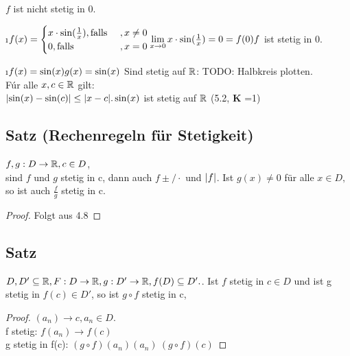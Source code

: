 \begin{enumerate}[a)]
$f$ ist nicht stetig in 0.
\begin{minipage}[c]{0.3\textwidth}
\end{minipage}
\i $f(x) = \begin{cases}
x \cdot \sin(\frac{1}{x}) , \text{falls }&, x \not = 0\\
0, \text{falls }&, x = 0\\
\end{cases}
\lim\limits_{x \rightarrow 0} x \cdot \sin(\frac{1}{x}) = 0 = f(0)\\
f$ ist stetig in 0.
\begin{minipage}[c]{0.3\textwidth}
\end{minipage}
\i $f(x) = \sin(x)\\
g(x) = \sin(x)
$
Sind stetig auf $\mathbb{R}$:
TODO: Halbkreis plotten.\\
Fúr alle $x,c \in \mathbb{R}$ gilt:\\
$\lvert \sin(x) - \sin(c) \rvert \leq \lvert x-c \rvert.\\
\sin(x)$ ist stetig auf $\mathbb{R}$ (5.2, $\mathbf{K}$ =1)
\end{enumerate}

\subsection{Satz (Rechenregeln für Stetigkeit)}
$f,g : D \rightarrow \mathbb{R}, c \in D$,\\
sind $f$ und $g$ stetig in c, dann auch $f \pm/\cdot$ und $\lvert f \rvert$. Ist $g(x) \neq 0$ für alle $x \in D,$ so ist auch $\frac{f}{g}$ stetig in c.\\
\begin{proof}
Folgt aus 4.8
\end{proof}
\subsection[Satz: Hintereinanderausführung von stetigen Funktionen]{Satz}
$D,D' \subseteq \mathbb{R} , F : D \rightarrow \mathbb{R},\\
g: D' \rightarrow \mathbb{R} , f(D) \subseteq D'.$.
Ist $f$ stetig in $c \in D$ und ist g stetig in $f(c) \in D'$, so ist $g \circ f$ stetig in c,
\begin{proof}
$(a_n) \rightarrow c, a_n \in D$.\\
f stetig: $f(a_n) \rightarrow f(c)$\\
g stetig in f(c): $(g \circ f)(a_n)(a_n)\ (g \circ f)(c)$
\end{proof}
